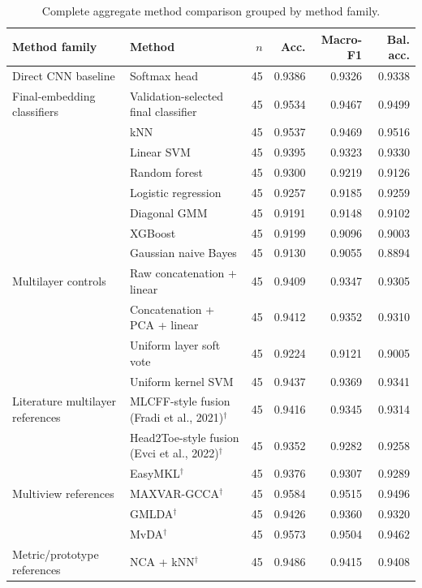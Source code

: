 \begin{table}[t]
\caption{Complete aggregate method comparison grouped by method family.}
\label{tab:complete_methods}
\centering
\scriptsize
\setlength{\tabcolsep}{4.2pt}
\begin{tabular}{p{3.1cm}p{7.1cm}rrrr}
\toprule
Method family & Method & $n$ & Acc. & Macro-F1 & Bal. acc. \\
\midrule
Direct CNN baseline & Softmax head & 45 & 0.9386 & 0.9326 & 0.9338 \\
\addlinespace[2pt]
Final-embedding classifiers & Validation-selected final classifier & 45 & 0.9534 & 0.9467 & 0.9499 \\
 & kNN & 45 & 0.9537 & 0.9469 & 0.9516 \\
 & Linear SVM & 45 & 0.9395 & 0.9323 & 0.9330 \\
 & Random forest & 45 & 0.9300 & 0.9219 & 0.9126 \\
 & Logistic regression & 45 & 0.9257 & 0.9185 & 0.9259 \\
 & Diagonal GMM & 45 & 0.9191 & 0.9148 & 0.9102 \\
 & XGBoost & 45 & 0.9199 & 0.9096 & 0.9003 \\
 & Gaussian naive Bayes & 45 & 0.9130 & 0.9055 & 0.8894 \\
\addlinespace[2pt]
Multilayer controls & Raw concatenation + linear & 45 & 0.9409 & 0.9347 & 0.9305 \\
 & Concatenation + PCA + linear & 45 & 0.9412 & 0.9352 & 0.9310 \\
 & Uniform layer soft vote & 45 & 0.9224 & 0.9121 & 0.9005 \\
 & Uniform kernel SVM & 45 & 0.9437 & 0.9369 & 0.9341 \\
\addlinespace[2pt]
Literature multilayer references & MLCFF-style fusion (Fradi et al., 2021)$^\dagger$ \cite{fradi2021multilayer} & 45 & 0.9416 & 0.9345 & 0.9314 \\
 & Head2Toe-style fusion (Evci et al., 2022)$^\dagger$ \cite{evci2022head2toe} & 45 & 0.9352 & 0.9282 & 0.9258 \\
 & EasyMKL$^\dagger$ & 45 & 0.9376 & 0.9307 & 0.9289 \\
\addlinespace[2pt]
Multiview references & MAXVAR-GCCA$^\dagger$ & 45 & 0.9584 & 0.9515 & 0.9496 \\
 & GMLDA$^\dagger$ & 45 & 0.9426 & 0.9360 & 0.9320 \\
 & MvDA$^\dagger$ & 45 & 0.9573 & 0.9504 & 0.9462 \\
\addlinespace[2pt]
Metric/prototype references & NCA + kNN$^\dagger$ & 45 & 0.9486 & 0.9415 & 0.9408 \\

\end{tabular}
\end{table}
